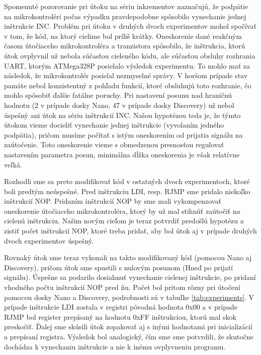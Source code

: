 Spomenuté pozorovanie pri útoku na sériu inkrementov naznačujú, že podpätie na mikrokontroléri počas výpadku pravdepodobne spôsobilo vynechanie jednej inštrukcie INC. Problém pri útoku v druhých dvoch experimentov mohol spočívať v tom, že kód, na ktorý cielime bol príliš krátky. Oneskorenie dané reakčným časom útočiaceho mikrokontroléra a tranzistora spôsobilo, že inštrukcia, ktorú útok ovplyvnil už nebola súčasťou cieleného kódu, ale súčasťou obsluhy rozhrania UART, ktorým ATMega328P posielalo výsledok experimentu. To mohlo mať za následok, že mikrokontrolér posielal nezmyselné správy. V horšom prípade stav pamäte nebol konzistentný z pohľadu funkcií, ktoré obsluhujú toto rozhranie, čo mohlo spôsobiť ďalšie fatálne poruchy. Pri nastavení posunu nad hraničnú hodnotu (2 v prípade dosky Nano, 47 v prípade dosky Discovery) už nebol úspešný ani útok na sériu inštrukcií INC. Našou hypotézou teda je, že týmto útokom vieme docieliť vynechanie jednej inštrukcie (vyvolaním jedného podpätia), pričom musíme počítať s istým oneskorením od prijatia signálu na zaútočenie. Toto oneskorenie vieme s obmedzenou presnosťou regulovať nastavením parametra posun, minimálna dĺžka oneskorenia je však relatívne veľká.

Rozhodli sme sa preto modifikovať kód v ostatných dvoch experimentoch, ktoré boli predtým neúspešné. Pred inštrukciu LDI, resp. RJMP sme pridalo niekoľko inštrukcií NOP. Pridaním inštrukcií NOP by sme mali vykompenzovať oneskorenie útočiaceho mikrokontroléra, ktorý by už mal stihnúť zaútočiť na cielenú inštrukciu. Našim novým cieľom je teraz potvrdiť predošlú hypotézu a zistiť počet inštrukcií NOP, ktoré treba pridať, aby bol útok aj v prípade druhých dvoch experimentov úspešný.

Rovnaký útok sme teraz vykonali na takto modifikovaný kód (pomocou Nano aj Discovery), pričom útok sme spustili s nulovým posunom (Hneď po prijatí signálu). Úspešne sa podarilo dosiahnuť vynechanie cielenej inštrukcie, po pridaní vhodného počtu inštrukcií NOP pred ňu. Počet bol pritom rôzny pri útočení pomocou dosky Nano a Discovery, podrobnosti sú v tabuľke \ref{tab:experiments}. V prípade inštrukcie LDI zostala v registri pôvodná hodnota 0x00 a v prípade RJMP bol register prepísaný na hodnotu 0xFF inštrukciou, ktorú mal skok preskočiť. Ďalej sme skúsili útok zopakovať aj s inými hodnotami pri inicializácií a prepísaní registra. Výsledok bol analogický, čím sme  sme potvrdili, že skutočne dochádza k vynechaniu inštrukcie a nie k inému ovplyvneniu programu.

